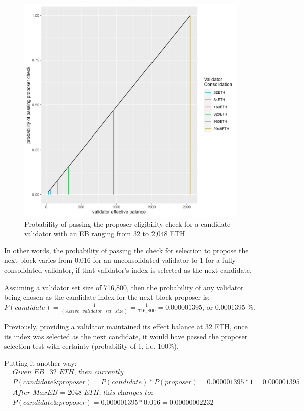 \begin{figure}[htbp]
\begin{center}
\includegraphics[width=0.6\linewidth]{images/proposer_check_graph}
\caption{Probability of passing the proposer eligibility check for a candidate validator with an EB ranging from 32 to 2,048 ETH}
\label{fig:proposerEB}
\end{center}
\end{figure}

In other words, the probability of passing the check for selection to propose the next block varies from 0.016 for an unconsolidated validator to 1 for a fully consolidated validator, if that validator’s index is selected as the next candidate.

Assuming a validator set size of 716,800, then
the probability of any validator being chosen as the candidate index for the next block proposer is: \\
$P(candidate) = \frac{1}{(Active \texttt{ } validator \texttt{ } set \texttt{ } size)} = \frac{1}{ 716,800} = 0.000001395$, or 0.0001395 \%. 

Previously, providing a validator maintained its effect balance at 32 ETH, once its index was selected as the next candidate, it would have passed the proposer selection test with certainty (probability of 1, i.e. 100\%).

Putting it another way:
\begin{equation*}
\begin{split}
& \textit{Given EB=32 ETH, then currently } \\
& P(candidate \& proposer) = P(candidate) * P(proposer) = 0.000001395 * 1 = 0.000001395 \\
& \textit{After MaxEB = 2048 ETH, this changes to:} \\
& P(candidate \& proposer) = 0.000001395 * 0.016 = 0.00000002232 \\
\end{split}
\end{equation*}

